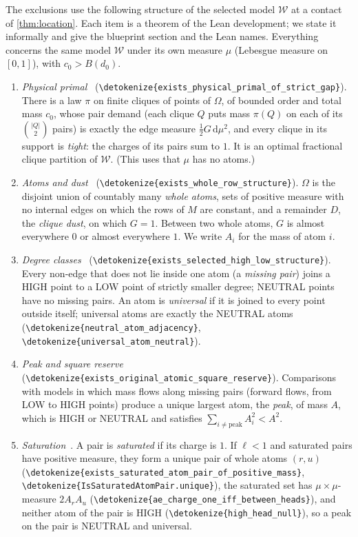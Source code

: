 \documentclass[10pt]{article}
\theoremstyle{definition}
\theoremstyle{remark}
\numberwithin{equation}{section}
\newcommand{\dd}{\mathrm{d}}
\newcommand{\Wm}{\mathcal{W}}
\newcommand{\leanid}[1]{\expandafter\nolinkurl\expandafter{\detokenize{#1}}}
\newcommand{\Fm}[1]{\cite[#1]{Formalization}}
\begin{document}
The exclusions use the following structure of the selected model $\Wm$ at a contact of \cref{thm:location}. Each item is a theorem of the Lean development; we state it informally and give the blueprint section and the Lean names. Everything concerns the same model $\Wm$ under its own measure $\mu$ (Lebesgue measure on $[0,1]$), with $c_0>B(d_0)$.

\begin{enumerate}[label=\textup{(S\arabic*)},leftmargin=2.6em]
\item \emph{Physical primal}~\Fm{\S8.4} (\leanid{exists_physical_primal_of_strict_gap}). There is a law $\pi$ on finite cliques of points of $\Omega$, of bounded order and total mass $c_0$, whose pair demand (each clique $Q$ puts mass $\pi(Q)$ on each of its $\binom{|Q|}2$ pairs) is exactly the edge measure $\frac12G\,\dd\mu^2$, and every clique in its support is \emph{tight}: the charges of its pairs sum to $1$. It is an optimal fractional clique partition of $\Wm$. (This uses that $\mu$ has no atoms.)
\item \emph{Atoms and dust}~\Fm{\S8.6} (\leanid{exists_whole_row_structure}). $\Omega$ is the disjoint union of countably many \emph{whole atoms}, sets of positive measure with no internal edges on which the rows of $M$ are constant, and a remainder $D$, the \emph{clique dust}, on which $G=1$. Between two whole atoms, $G$ is almost everywhere $0$ or almost everywhere $1$. We write $A_i$ for the mass of atom $i$.
\item \emph{Degree classes}~\Fm{\S8.7} (\leanid{exists_selected_high_low_structure}). Every non-edge that does not lie inside one atom (a \emph{missing pair}) joins a HIGH point to a LOW point of strictly smaller degree; NEUTRAL points have no missing pairs. An atom is \emph{universal} if it is joined to every point outside itself; universal atoms are exactly the NEUTRAL atoms (\leanid{neutral_atom_adjacency}, \leanid{universal_atom_neutral}).
\item \emph{Peak and square reserve}~\Fm{\S8.8, \S8.10} (\leanid{exists_original_atomic_square_reserve}). Comparisons with models in which mass flows along missing pairs (forward flows, from LOW to HIGH points) produce a unique largest atom, the \emph{peak}, of mass $A$, which is HIGH or NEUTRAL and satisfies $\sum_{i\ne\mathrm{peak}}A_i^2<A^2$.
\item \emph{Saturation}~\Fm{\S8.10}. A pair is \emph{saturated} if its charge is $1$. If $\ell<1$ and saturated pairs have positive measure, they form a unique pair of whole atoms $(r,u)$ (\leanid{exists_saturated_atom_pair_of_positive_mass}, \leanid{IsSaturatedAtomPair.unique}), the saturated set has $\mu\times\mu$-measure $2A_rA_u$ (\leanid{ae_charge_one_iff_between_heads}), and neither atom of the pair is HIGH (\leanid{high_head_null}), so a peak on the pair is NEUTRAL and universal.

\end{enumerate}
\end{document}
